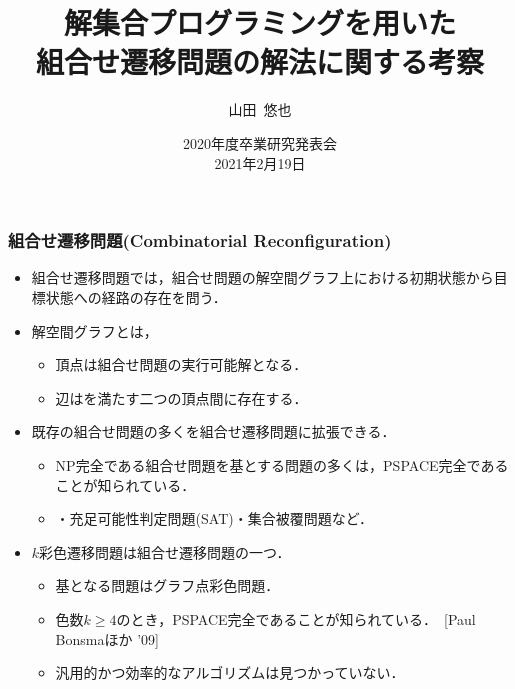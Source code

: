 \documentclass[dvipdfmx,11pt]{beamer}
\title[ASPを用いた組合せ遷移問題の解法に関する考察]{解集合プログラミングを用いた\\組合せ遷移問題の解法に関する考察}
\author{山田~悠也}
\date{2020年度卒業研究発表会\\2021年2月19日}
\institute{番原研究室}
\begin{document}
\begin{frame}\frametitle{}
  \titlepage
\end{frame}

\begin{frame}\frametitle{組合せ遷移問題(Combinatorial Reconfiguration)}

  \begin{itemize}
    \item \alert{組合せ遷移問題}では，組合せ問題の解空間グラフ上における初期状態から目標状態への経路の存在を問う．
    \item \alert{解空間グラフ}とは，
    \begin{itemize}
      \item 頂点は組合せ問題の実行可能解となる．
      \item 辺はを満たす二つの頂点間に存在する．
    \end{itemize} 
    \item 既存の組合せ問題の多くを組合せ遷移問題に拡張できる．
    \begin{itemize}
      \item NP完全である組合せ問題を基とする問題の多くは，\alert{PSPACE完全}であることが知られている．
      \item {}・充足可能性判定問題(SAT)・集合被覆問題など．
    \end{itemize}
    \item \alert{$k$彩色遷移問題}は組合せ遷移問題の一つ．
    \begin{itemize}
      \item 基となる問題はグラフ点彩色問題．
      \item 色数$k \geq 4$のとき，PSPACE完全であることが知られている．~[Paul Bonsmaほか '09]
      \item \alert{汎用的かつ効率的なアルゴリズムは見つかっていない}．
    \end{itemize}
  \end{itemize}

\end{frame}

\end{document}
